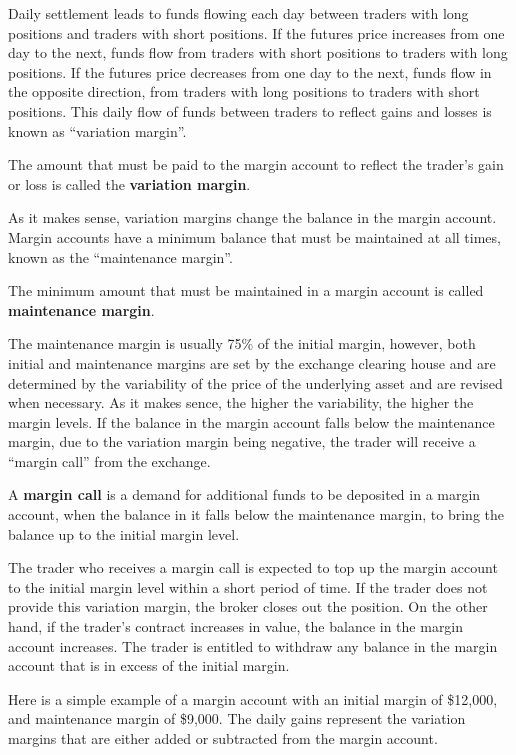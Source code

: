 Daily settlement leads to funds flowing each day between traders with long positions and traders with short positions.
If the futures price increases from one day to the next, funds flow from traders with short positions to traders with
long positions. If the futures price decreases from one day to the next, funds flow in the opposite direction, from
traders with long positions to traders with short positions. This daily flow of funds between traders to reflect gains
and losses is known as ``variation margin''.

The amount that must be paid to the margin account to reflect the trader's gain or loss is called the \textbf{variation
margin}.
\ed

As it makes sense, variation margins change the balance in the margin account. Margin accounts have a minimum balance
that must be maintained at all times, known as the ``maintenance margin''.

The minimum amount that must be maintained in a margin account is called \textbf{maintenance margin}.
\ed

The maintenance margin is usually 75\% of the initial margin, however, both initial and maintenance margins are set
by the exchange clearing house and are determined by the variability of the price of the underlying asset and are
revised when necessary. As it makes sence, the higher the variability, the higher the margin levels. If the balance
in the margin account falls below the maintenance margin, due to the variation margin being negative, the trader
will receive a ``margin call'' from the exchange.

A \textbf{margin call} is a demand for additional funds to be deposited in a margin account, when the balance in it
falls below the maintenance margin, to bring the balance up to the initial margin level.
\ed

The trader who receives a margin call is expected to top up the margin account to the initial margin level within a
short period of time. If the trader does not provide this variation margin, the broker closes out the position. On
the other hand, if the trader's contract increases in value, the balance in the margin account increases. The trader
is entitled to withdraw any balance in the margin account that is in excess of the initial margin.

\be
Here is a simple example of a margin account with an initial margin of \$12,000, and maintenance margin of \$9,000.
The daily gains represent the variation margins that are either added or subtracted from the margin account.
\ee

